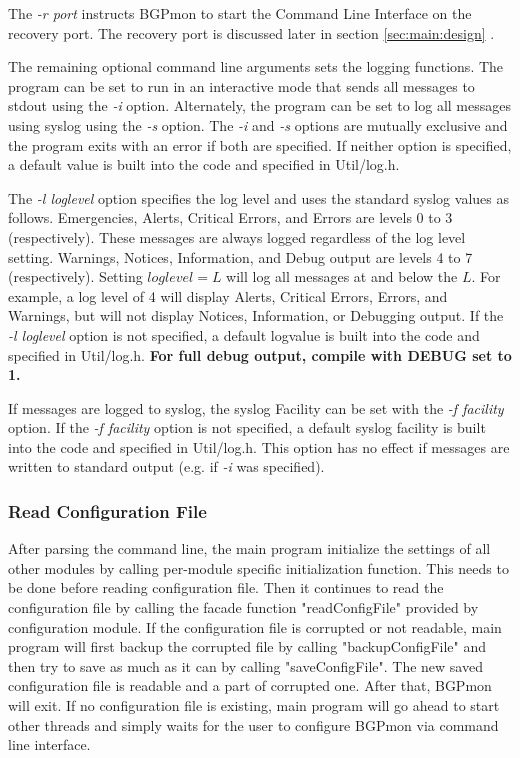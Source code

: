 The \emph{-r port} instructs BGPmon to start the Command Line Interface on the recovery port.  The recovery port is discussed later in section  \ref{sec:main:design} .%

The remaining optional command line arguments sets the logging functions.    The program can be set to run in an interactive mode that sends all messages to stdout using the \emph{-i} option.    Alternately, the program can be set to log all messages using syslog using the \emph{-s} option.    The \emph{-i} and \emph{-s} options are mutually exclusive and the program exits with an error if both are specified.    If neither option is specified,  a default value is built into the code and specified in Util/log.h.     

The \emph{-l loglevel} option specifies the log level and uses the standard syslog values as follows.    Emergencies, Alerts, Critical Errors, and Errors are levels 0 to 3 (respectively).    These messages are always logged regardless of the log level setting.    Warnings, Notices, Information, and Debug output are levels 4 to 7 (respectively).   Setting $loglevel = L$ will log all messages at and below the $L$.   For example, a log level of 4 will display Alerts, Critical Errors, Errors, and Warnings, but will not display Notices, Information, or Debugging output.     If the \emph{-l loglevel} option is not specified,  a default logvalue is built into the code and specified in Util/log.h.   {\bf For full debug output,   compile with DEBUG set to 1.}

If messages are logged to syslog, the syslog Facility can be set with the \emph{-f facility} option.    If the \emph{-f facility} option is not specified,  a default syslog facility is built into the code and specified in Util/log.h.     This option has no effect if messages are written to standard output (e.g. if \emph{-i} was specified).    

\subsubsection{Read Configuration File}
After parsing the command line, the main program initialize the settings of all other modules by calling per-module specific initialization function. This needs to be done before reading configuration file.
Then it continues to read the configuration file by calling the facade function "readConfigFile" provided by configuration module. 
If the configuration file is corrupted or not readable, main program will first backup the corrupted file by calling "backupConfigFile" and then try to save as much as it can by calling "saveConfigFile". The new saved configuration file is readable and a part of corrupted one. After that, BGPmon will exit.
If no configuration file is existing, main program will go ahead to start other threads and simply waits for the user to configure BGPmon via command line interface.


